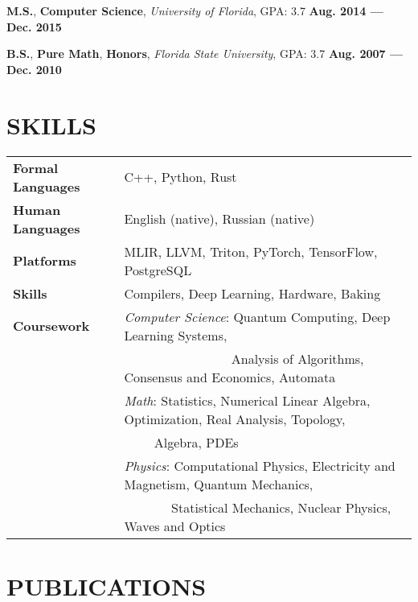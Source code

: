 \documentclass[11pt,letterpaper,roman,colorlinks,linkcolor=blue]{moderncv}
\newcommand*{\modern}{\fontfamily{qhv}\selectfont}
\newcommand{\mystyle}[1]{\textcolor{mygrey}{\modern #1}}
\newcommand{\mysectionstyle}[1]{\large\mystyle{#1}}
\begin{document}
\textbf{M.S.}, \textbf{Computer Science}, \emph{University of Florida}, GPA: 3.7
\hfill \textbf{Aug. 2014 --- Dec. 2015}

\textbf{B.S.}, \textbf{Pure Math}, \textbf{Honors}, \emph{Florida State University}, GPA: 3.7
\hfill \textbf{Aug. 2007 --- Dec. 2010}


\section{\mysectionstyle{SKILLS}}

\begin{tabular}{ @{} >{\bfseries}l @{\hspace{6ex}} l }
Formal Languages & C++, Python, Rust \\
Human Languages & English (native), Russian (native) \\
Platforms  & MLIR, LLVM, Triton, PyTorch, TensorFlow, PostgreSQL \\
Skills     & Compilers, Deep Learning, Hardware, Baking \\
Coursework & \textit{Computer Science}: Quantum Computing, Deep Learning Systems, \\
	   & $\qquad$ $\qquad$ $\qquad$ $\quad$ Analysis of Algorithms, Consensus and Economics, Automata \\
           & \textit{Math}: Statistics, Numerical Linear Algebra, Optimization, Real Analysis, Topology, \\
           & $\qquad$ \hspace{0.5ex} Algebra, PDEs  \\
           & \textit{Physics}: Computational Physics, Electricity and Magnetism, Quantum Mechanics, \\ 
           & $\qquad$ $\quad$ \hspace{0.00ex} Statistical Mechanics, Nuclear Physics, Waves and Optics
\end{tabular}


\section{\mysectionstyle{PUBLICATIONS}}
\end{document}
